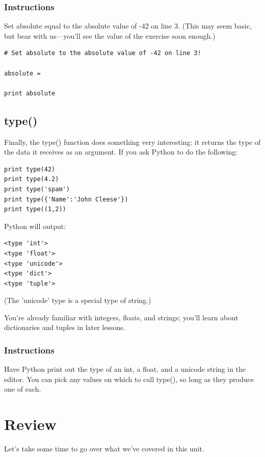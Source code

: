 \documentclass[12pt,a4paper,final,twoside,onecolumn,titlepage]{book}
\begin{document}
\subsubsection{Instructions}

Set absolute equal to the absolute value of -42 on line 3. (This may seem basic, but bear with us—you'll see the value of the exercise soon enough.)

\begin{lstlisting}
# Set absolute to the absolute value of -42 on line 3!

absolute = 

print absolute
\end{lstlisting}

\subsection{type()}

Finally, the type() function does something very interesting: it returns the type of the data it receives as an argument. If you ask Python to do the following:
\begin{lstlisting}
print type(42)
print type(4.2)
print type('spam')
print type({'Name':'John Cleese'})
print type((1,2))
\end{lstlisting}

Python will output:
\begin{lstlisting}
<type 'int'>
<type 'float'>
<type 'unicode'>
<type 'dict'>
<type 'tuple'>
\end{lstlisting}

(The 'unicode' type is a special type of string.)

You're already familiar with integers, floats, and strings; you'll learn about dictionaries and tuples in later lessons.

\subsubsection{Instructions}

Have Python print out the type of an int, a float, and a unicode string in the editor. You can pick any values on which to call type(), so long as they produce one of each.


\section{Review}

    Let's take some time to go over what we've covered in this unit.
\end{document}
